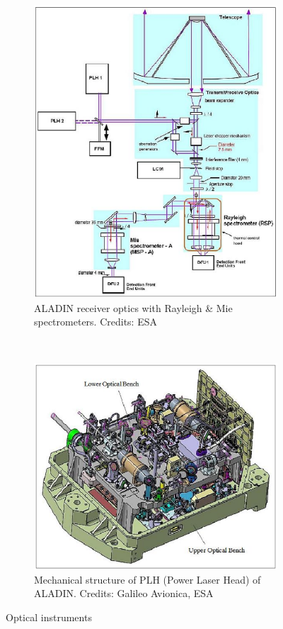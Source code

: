 \begin{figure}[h]
	\centering
	\begin{subfigure}{0.45\textwidth}
		\includegraphics[width=\textwidth]{img/optics.png}
		\caption{ALADIN receiver optics with Rayleigh \& Mie spectrometers. Credits: ESA}
		\label{fig:optics}
	\end{subfigure}
	~
	\begin{subfigure}{0.45\textwidth}
		\includegraphics[width=\textwidth]{img/optical_bench.png}
		\caption{Mechanical structure of PLH (Power Laser Head) of ALADIN.
		Credits: Galileo Avionica, ESA}
		\label{fig:PLH}
	\end{subfigure}
	\caption[Optical instruments]{Optical instruments \cite{aeolus_webpage}}
	\label{fig:optical}
\end{figure}

